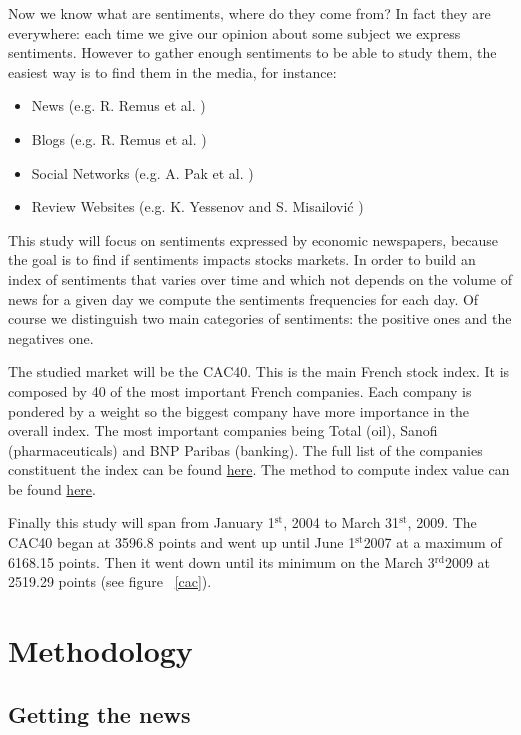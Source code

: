 \documentclass[12pt]{report}
\newcommand{\superscript}[1]{\ensuremath{^{\textrm{#1}}}}
\newcommand{\st}[0]{\superscript{st}}
\newcommand{\rd}[0]{\superscript{rd}}
\begin{document}
Now we know what are sentiments, where do they come from? In fact they are everywhere: each time we give our opinion about some subject we express sentiments. However to gather enough sentiments to be able to study them, the easiest way is to find them in the media, for instance:
\begin{itemize}
	\item News (e.g. R. Remus et al. \cite{remus09})
	\item Blogs (e.g. R. Remus et al. \cite{remus09})
	\item Social Networks (e.g. A. Pak et al. \cite{pak10})
	\item Review Websites (e.g. K. Yessenov and S. Misailovi\'c \cite{yessenov09})
\end{itemize}

This study will focus on sentiments expressed by economic newspapers, because the goal is to find if sentiments impacts stocks markets. In order to build an index of sentiments that varies over time and which not depends on the volume of news for a given day we compute the sentiments frequencies for each day. Of course we distinguish two main categories of sentiments: the positive ones and the negatives one.

The studied market will be the CAC40. This is the main French stock index. It is composed by 40 of the most important French companies. Each company is pondered by a weight so the biggest company have more importance in the overall index. The most important companies being Total (oil), Sanofi (pharmaceuticals) and BNP Paribas (banking). The full list of the companies constituent the index can be found \href{http://en.wikipedia.org/wiki/CAC40}{here}. The method to compute index value can be found \href{http://www.euronext.com/fic/000/050/871/508718.pdf}{here}.

Finally this study will span from January 1\st, 2004 to March 31\st, 2009. The CAC40 began at 3596.8 points and went up until June 1\st 2007 at a maximum of 6168.15 points. Then it went down until its minimum on the March 3\rd 2009 at 2519.29 points (see figure ~\ref{cac}).

\chapter{Methodology}
\section{Getting the news}
\end{document}
